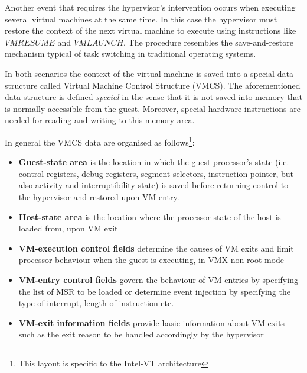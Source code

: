 Another event that requires the hypervisor's intervention occurs when executing several virtual machines at the same time. In this case the hypervisor must restore the context of the next virtual machine to execute using instructions like $VMRESUME$ and $VMLAUNCH$. The procedure resembles the save-and-restore mechanism typical of task switching in traditional operating systems.%

In both scenarios the context of the virtual machine is saved into a special data structure called Virtual Machine Control Structure (VMCS). The aforementioned data structure is defined \emph{special} in the sense that it is not saved into memory that is normally accessible from the guest. Moreover, special hardware instructions are needed for reading and writing to this memory area.

In general the VMCS data are organised as follows\footnote{This layout is specific to the Intel-VT architecture}:

\begin{itemize}
\item \textbf{Guest-state area} is the location in which the guest processor's state (i.e. control registers, debug registers, segment selectors, instruction pointer, but also activity and interruptibility state) is saved before returning control to the hypervisor and restored upon VM entry.

\item{\textbf{Host-state area}} is the location where the processor state of the host is loaded from, upon VM exit

\item {\textbf{VM-execution control fields}} determine the causes of VM exits and limit processor behaviour when the guest is executing, in VMX non-root mode

\item{\textbf{VM-entry control fields}} govern the behaviour of VM entries by specifying the list of MSR to be loaded or determine event injection by specifying the type of interrupt, length of instruction etc.%

\item{\textbf{VM-exit information fields}} provide basic information about VM exits such as the exit reason to be handled accordingly by the hypervisor
\end{itemize}


